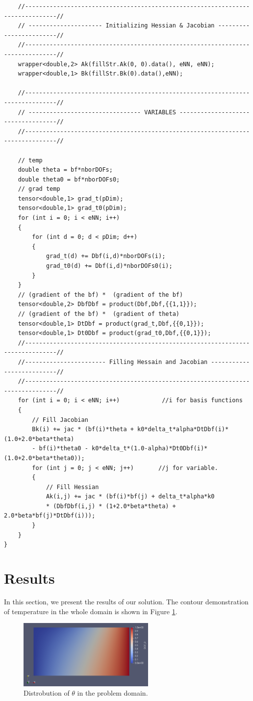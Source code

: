 \documentclass[]{article}
\begin{document}
\begin{lstlisting}
	//-------------------------------------------------------------------------------//
	// --------------------- Initializing Hessian & Jacobian ------------------------//
	//-------------------------------------------------------------------------------//
	wrapper<double,2> Ak(fillStr.Ak(0, 0).data(), eNN, eNN);
	wrapper<double,1> Bk(fillStr.Bk(0).data(),eNN);
	
	//-------------------------------------------------------------------------------//
	// -------------------------------- VARIABLES -----------------------------------//
	//-------------------------------------------------------------------------------//
	
	// temp
	double theta = bf*nborDOFs;
	double theta0 = bf*nborDOFs0;
	// grad temp
	tensor<double,1> grad_t(pDim);
	tensor<double,1> grad_t0(pDim);
	for (int i = 0; i < eNN; i++)
	{
		for (int d = 0; d < pDim; d++)
		{
			grad_t(d) += Dbf(i,d)*nborDOFs(i);
			grad_t0(d) += Dbf(i,d)*nborDOFs0(i);
		}
	}
	// (gradient of the bf) *  (gradient of the bf)
	tensor<double,2> DbfDbf = product(Dbf,Dbf,{{1,1}});
	// (gradient of the bf) *  (gradient of theta)
	tensor<double,1> DtDbf = product(grad_t,Dbf,{{0,1}});
	tensor<double,1> Dt0Dbf = product(grad_t0,Dbf,{{0,1}});
	//-------------------------------------------------------------------------------//
	//----------------------- Filling Hessain and Jacobian --------------------------//
	//-------------------------------------------------------------------------------// 
	for (int i = 0; i < eNN; i++)            //i for basis functions
	{
		// Fill Jacobian
		Bk(i) += jac * (bf(i)*theta + k0*delta_t*alpha*DtDbf(i)*(1.0+2.0*beta*theta) 
		- bf(i)*theta0 - k0*delta_t*(1.0-alpha)*Dt0Dbf(i)*(1.0+2.0*beta*theta0));
		for (int j = 0; j < eNN; j++)       //j for variable.
		{
			// Fill Hessian
			Ak(i,j) += jac * (bf(i)*bf(j) + delta_t*alpha*k0
			* (DbfDbf(i,j) * (1+2.0*beta*theta) + 2.0*beta*bf(j)*DtDbf(i)));
		}
	}
}

\end{lstlisting}

\section{Results} \label{sec: rst}
In this section, we present the results of our solution. The contour demonstration of temperature in the whole domain is shown in Figure \ref{fig_Rs2}.
\begin{figure}[htbp]
	\centering
	\includegraphics[width=0.6\textwidth]{Figures/result.png}
	\caption{Distrobution of $\theta$ in the problem domain.}
	\label{fig_Rs2}
\end{figure}

 
\end{document}
